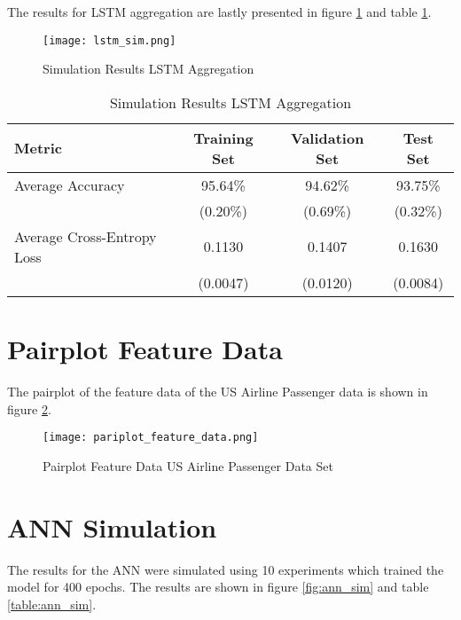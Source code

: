   \noindent The results for LSTM aggregation are lastly presented in figure
  \ref{fig:lstm_sim} and table \ref{table:lstm_sim}. 

  \begin{figure}[h]
		\centering
		\texttt{[image: lstm\_sim.png]}
		\caption{Simulation Results LSTM Aggregation}
        \label{fig:lstm_sim}
  \end{figure}

  \begin{table}[h]
    \centering
      \begin{tabular}{|l||c|c|c|}
      \hline
      \textbf{Metric} & \textbf{Training Set} & \textbf{Validation Set} & 
      \textbf{Test Set}\\
      \hline\hline
      Average Accuracy & 95.64\% & 94.62\% & 93.75\% \\\hline 
                       & (0.20\%) & (0.69\%) & (0.32\%) \\\hline
      Average Cross-Entropy Loss & 0.1130 & 0.1407 & 0.1630 \\\hline
                                 & (0.0047) & (0.0120) & (0.0084) \\
      \hline
    \end{tabular}
    \caption{Simulation Results LSTM Aggregation}
    \label{table:lstm_sim}
  \end{table}


  \section{Pairplot Feature Data}
  \label{App:pairplot}
  
  The pairplot of the feature data of the US Airline Passenger data is shown in
  figure \ref{fig:pairplot_feature}.

  \begin{figure}[h]
		\centering
		\texttt{[image: pariplot\_feature\_data.png]}
		\caption{Pairplot Feature Data US Airline Passenger Data Set}
        \label{fig:pairplot_feature}
  \end{figure}

  \section{ANN Simulation}
  \label{App:ann_sim}

  The results for the ANN were simulated using 10 experiments which trained the
  model for 400 epochs. The results are shown in figure \ref{fig:ann_sim} and 
  table \ref{table:ann_sim}. 

